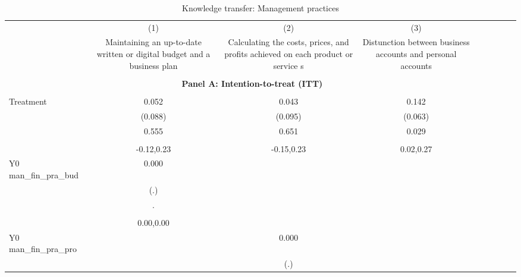 \begin{table}[!h] \centering \\ \caption{Knowledge transfer: Management practices} \\ \begin{adjustbox}{width=\columnwidth,center} \\ \begin{tabular}{l*{8}{c}} \hline\hline
                    &\multicolumn{1}{c}{(1)}         &\multicolumn{1}{c}{(2)}         &\multicolumn{1}{c}{(3)}         \\
                    &Maintaining an up-to-date written or digital budget and a business plan         &Calculating the costs, prices, and profits achieved on each product or service s         &Distunction between business accounts and personal accounts         \\
\hline \\ \multicolumn{7}{c}{\textbf{Panel A: Intention-to-treat (ITT)}} \\\\[-1ex]
Treatment           &       0.052         &       0.043         &       0.142\sym{**} \\
                    &     (0.088)         &     (0.095)         &     (0.063)         \\
                    &       0.555         &       0.651         &       0.029         \\
                    &                     &                     &                     \\
                    &  -0.12,0.23         &  -0.15,0.23         &   0.02,0.27         \\
Y0 man\_fin\_pra\_bud  &       0.000         &                     &                     \\
                    &         (.)         &                     &                     \\
                    &           .         &                     &                     \\
                    &                     &                     &                     \\
                    &   0.00,0.00         &                     &                     \\
Y0 man\_fin\_pra\_pro  &                     &       0.000         &                     \\
                    &                     &         (.)         &                     \\

\end{tabular}
\end{adjustbox}
\end{table}
